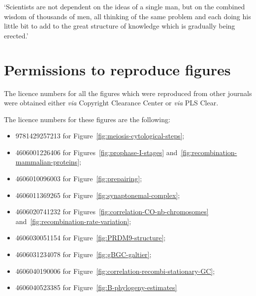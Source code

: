 \begin{savequote}[8cm]

	‘Scientists are not dependent on the ideas of a single man, but on the combined wisdom of thousands of men, all thinking of the same problem and each doing his little bit to add to the great structure of knowledge which is gradually being erected.’

\end{savequote}

\chapter{\label{app:permissions}Permissions to reproduce figures}

\minitoc{}


The licence numbers for all the figures which were reproduced from other journals were obtained either \textit{via} Copyright Clearance Center or \textit{via} PLS Clear.

The licence numbers for these figures are the following:

\begin{itemize}
	\item{9781429257213 for Figure~\ref{fig:meiosis-cytological-steps};}
	\item{4606001226406 for Figures~\ref{fig:prophase-I-stages} and~\ref{fig:recombination-mammalian-proteins};}
	\item{4606010096003 for Figure~\ref{fig:prepairing};}
	\item{4606011369265 for Figure~\ref{fig:synaptonemal-complex};}

	\item{4606020741232 for Figures~\ref{fig:correlation-CO-nb-chromosomes} and~\ref{fig:recombination-rate-variation};}
	\item{4606030051154 for Figure~\ref{fig:PRDM9-structure};}

	\item{4606031234078 for Figure~\ref{fig:gBGC-galtier};}
	\item{4606040190006 for Figure~\ref{fig:correlation-recombi-stationary-GC};}
	\item{4606040523385 for Figure~\ref{fig:B-phylogeny-estimates}}

\end{itemize}

